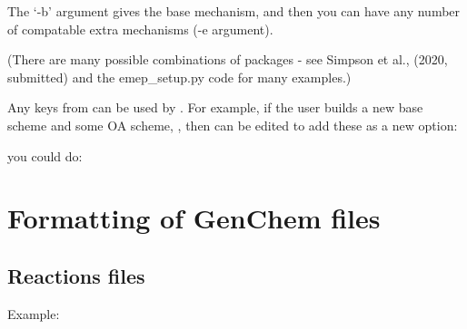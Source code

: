 \documentclass[a4paper,10pt,english]{sphinxmanual}
\begin{document}
The ‘-b’ argument gives the base mechanism, and then you can have any number of compatable extra mechanisms (-e argument).

(There are many possible combinations of packages - see Simpson et al., (2020, submitted) and the emep\_setup.py code for many examples.)

Any keys from  can be used by . For example, if the user builds a new base scheme  and
some OA scheme, , then  can be edited to add these as a new option:

\begin{sphinxVerbatim}[commandchars=\\\{\}]
\PYG{p}{[}\PYG{p}{]} 
\end{sphinxVerbatim}

you could do:

\begin{sphinxVerbatim}[commandchars=\\\{\}]
    

   
\end{sphinxVerbatim}


\chapter{Formatting of GenChem files}
\label{\detokenize{GenChemDoc_chem:formatting-of-genchem-files}}\label{\detokenize{GenChemDoc_chem::doc}}

\section{Reactions files}
\label{\detokenize{GenChemDoc_chem:reactions-files}}
Example:
\end{document}

